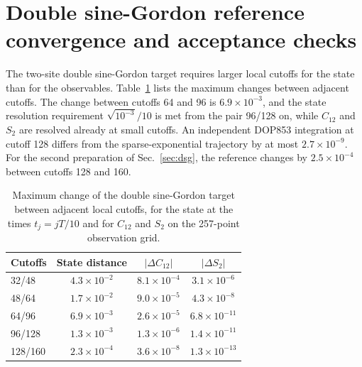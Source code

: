 \documentclass[pra,twocolumn,superscriptaddress,nofootinbib,floatfix]{revtex4-2}
\theoremstyle{remark}
\begin{document}
\section{Double sine-Gordon reference convergence and acceptance checks}
\label{app:dsg-convergence}

The two-site double sine-Gordon target requires larger local cutoffs for the state than for the observables. Table~\ref{tab:dsg-convergence} lists the maximum changes between adjacent cutoffs. The change between cutoffs 64 and 96 is \(6.9\times10^{-3}\), and the state resolution requirement \(\sqrt{10^{-3}}/10\) is met from the pair 96/128 on, while \(C_{12}\) and \(S_2\) are resolved already at small cutoffs. An independent DOP853 integration at cutoff 128 differs from the sparse-exponential trajectory by at most \(2.7\times10^{-9}\). For the second preparation of Sec.~\ref{sec:dsg}, the reference changes by \(2.5\times10^{-4}\) between cutoffs 128 and 160.

\begin{table}[t]
\caption{Maximum change of the double sine-Gordon target between adjacent local cutoffs, for the state at the times \(t_j=jT/10\) and for \(C_{12}\) and \(S_2\) on the 257-point observation grid.}
\label{tab:dsg-convergence}
\begin{ruledtabular}
\begin{tabular}{lccc}
Cutoffs & State distance & \(|\Delta C_{12}|\) & \(|\Delta S_2|\) \\
\hline
32/48 & \(4.3\times10^{-2}\) & \(8.1\times10^{-4}\) & \(3.1\times10^{-6}\) \\
48/64 & \(1.7\times10^{-2}\) & \(9.0\times10^{-5}\) & \(4.3\times10^{-8}\) \\
64/96 & \(6.9\times10^{-3}\) & \(2.6\times10^{-5}\) & \(6.8\times10^{-11}\) \\
96/128 & \(1.3\times10^{-3}\) & \(1.3\times10^{-6}\) & \(1.4\times10^{-11}\) \\
128/160 & \(2.3\times10^{-4}\) & \(3.6\times10^{-8}\) & \(1.3\times10^{-13}\) \\
\end{tabular}
\end{ruledtabular}
\end{table}
\end{document}
